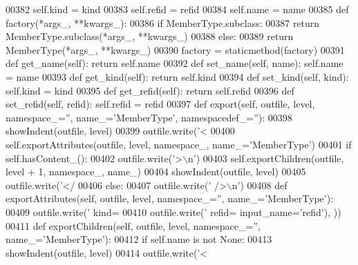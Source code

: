 \begin{DoxyCode}
{{{{{{{{{{{{{{{{{{{{{{{{{{{{{{{{00382         self.kind = kind
00383         self.refid = refid
00384         self.name = name
00385     \textcolor{keyword}{def }factory(*args\_, **kwargs\_):
00386         \textcolor{keywordflow}{if} MemberType.subclass:
00387             \textcolor{keywordflow}{return} MemberType.subclass(*args\_, **kwargs\_)
00388         \textcolor{keywordflow}{else}:
00389             \textcolor{keywordflow}{return} MemberType(*args\_, **kwargs\_)
00390     factory = staticmethod(factory)
00391     \textcolor{keyword}{def }get_name(self): \textcolor{keywordflow}{return} self.name
00392     \textcolor{keyword}{def }set_name(self, name): self.name = name
00393     \textcolor{keyword}{def }get_kind(self): \textcolor{keywordflow}{return} self.kind
00394     \textcolor{keyword}{def }set_kind(self, kind): self.kind = kind
00395     \textcolor{keyword}{def }get_refid(self): \textcolor{keywordflow}{return} self.refid
00396     \textcolor{keyword}{def }set_refid(self, refid): self.refid = refid
00397     \textcolor{keyword}{def }export(self, outfile, level, namespace\_='', name\_='MemberType', namespacedef\_=''):
00398         showIndent(outfile, level)
00399         outfile.write(\textcolor{stringliteral}{'<%
00400         self.exportAttributes(outfile, level, namespace\_, name\_=\textcolor{stringliteral}{'MemberType'})
00401         \textcolor{keywordflow}{if} self.hasContent_():
00402             outfile.write(\textcolor{stringliteral}{'>\(\backslash\)n'})
00403             self.exportChildren(outfile, level + 1, namespace\_, name\_)
00404             showIndent(outfile, level)
00405             outfile.write(\textcolor{stringliteral}{'</%
00406         \textcolor{keywordflow}{else}:
00407             outfile.write(\textcolor{stringliteral}{' />\(\backslash\)n'})
00408     \textcolor{keyword}{def }exportAttributes(self, outfile, level, namespace\_='', name\_='MemberType'):
00409         outfile.write(\textcolor{stringliteral}{' kind=%
00410         outfile.write(\textcolor{stringliteral}{' refid=%
      input\_name=\textcolor{stringliteral}{'refid'}), ))
00411     \textcolor{keyword}{def }exportChildren(self, outfile, level, namespace\_='', name\_='MemberType'):
00412         \textcolor{keywordflow}{if} self.name \textcolor{keywordflow}{is} \textcolor{keywordflow}{not} \textcolor{keywordtype}{None}:
00413             showIndent(outfile, level)
00414             outfile.write(\textcolor{stringliteral}{'<%
}}}}}}}}}}}}}}}}}}}}}}}}}}}}}}}}}}}}}
\end{DoxyCode}
